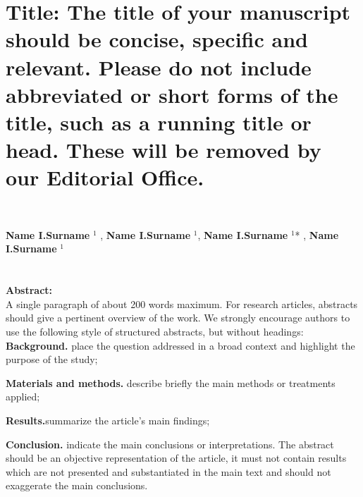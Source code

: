 \documentclass[i-edu.uz,journal,article,submit,pdftex,moreauthors]{Definitions/i-edu.uz}
\begin{document}
\begin{sloppypar}

\section*{\Large \textbf{Title: { \large The title of your manuscript should be concise, specific and relevant. Please do not include abbreviated or short forms of the title, such as a running title or head. These will be removed by our Editorial Office.}}}\\

\begingroup

\raggedright 

\textbf{Name I.Surname}  $^{1}$ \orcidA{}, \textbf{Name I.Surname}  $^{1}$\orcidS{}, \textbf{Name I.Surname}  $^{1}$* \orcidD{}, \textbf{Name I.Surname}  $^{1}$\orcidG{}\\
\endgroup\\ 


\\

\noindent\textbf{Abstract:}\\A single paragraph of about 200 words maximum. For research articles, abstracts should give a pertinent overview of the work. We strongly encourage authors to use the following style of structured abstracts, but without headings:
\\
\textbf{Background.} place the question addressed in a broad context and highlight the purpose of the study;

\noindent\textbf{Materials and methods.} describe briefly the main methods or treatments applied; 

\noindent\textbf{Results.}summarize the article's main findings;

\noindent\textbf{Conclusion.} indicate the main conclusions or interpretations. The abstract should be an objective representation of the article, it must not contain results which are not presented and substantiated in the main text and should not exaggerate the main conclusions.\\


\end{sloppypar}
\end{document}
